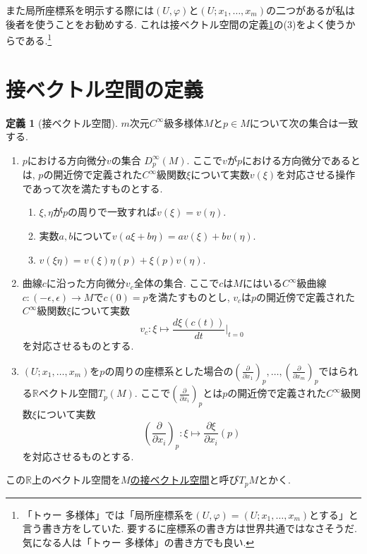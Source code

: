 \documentclass[dvipdfmx,a4paper,11pt]{article}
\newcommand{\R}{\mathbb{R}}
\theoremstyle{definition}
\newtheorem{dfn}[thm]{定義}
\newcommand{\pdrv}[2]{\frac{\partial #1}{\partial #2}}
\newcommand{\drv}[2]{\frac{d #1}{d#2}}
\begin{document}
また局所座標系を明示する際には$(U, \varphi)$と$(U; x_1, \ldots, x_m)$の二つがあるが私は後者を使うことをお勧めする. これは接ベクトル空間の定義\ref{tangent_vector_space}の(3)をよく使うからである.\footnote{「トゥー 多様体」では「局所座標系を$(U, \varphi)=(U; x_1, \ldots, x_m)$とする」と言う書き方をしていた. 要するに座標系の書き方は世界共通ではなさそうだ. 気になる人は「トゥー 多様体」の書き方でも良い.} 
 
\section{接ベクトル空間の定義}
\begin{tcolorbox}[
    colback = white,
    colframe = green!35!black,
    fonttitle = \bfseries,
    breakable = true]
    \begin{dfn}[接ベクトル空間]
    \label{tangent_vector_space}
    $m$次元$C^{\infty}$級多様体$M$と$p \in M$について次の集合は一致する.
     \begin{enumerate}
          \setlength{\parskip}{0cm}
  \setlength{\itemsep}{2pt} 
     \item $p$における方向微分$v$の集合 $D_{p}^{\infty}(M)$. ここで$v$が$p$における方向微分であるとは, $p$の開近傍で定義された$C^{\infty}$級関数$\xi$について実数$v(\xi)$を対応させる操作であって次を満たすものとする.
    \begin{enumerate}
         \setlength{\parskip}{0cm}
  \setlength{\itemsep}{2pt} 
    \item $\xi,\eta$が$p$の周りで一致すれば$v(\xi) =v(\eta)$.
    \item 実数$a,b$について$v(a\xi + b\eta)=av(\xi) + bv(\eta)$.
    \item $v(\xi\eta) = v(\xi)\eta(p) + \xi(p)v(\eta) $.
    \end{enumerate}
     \item 曲線$c$に沿った方向微分$v_{c}$全体の集合. ここで$c$は$M$にはいる$C^{\infty}$級曲線$c : (-\epsilon, \epsilon) \rightarrow M$で$c(0)=p$を満たすものとし, $v_{c}$は$p$の開近傍で定義された$C^{\infty}$級関数$\xi$について実数
     $$
     v_{c}:\xi \mapsto \drv{\xi(c(t))}{t}\Bigr|_{t=0}
     $$
     を対応させるものとする.
     \item $(U; x_1, \ldots, x_m)$を$p$の周りの座標系とした場合の$(\pdrv{}{x_1})_{p}, \ldots, (\pdrv{}{x_m})_{p}$ではられる$\R$ベクトル空間$T_{p}(M)$. ここで$(\pdrv{}{x_i})_{p}$とは$p$の開近傍で定義された$C^{\infty}$級関数$\xi$について実数
     $$
   \left(\pdrv{}{x_i}\right)_{p} :   \xi \mapsto \pdrv{\xi}{x_i}(p)
     $$
     を対応させるものとする.
     \end{enumerate}
     
     
この$\R$上のベクトル空間を\underline{$M$の接ベクトル空間}と呼び$T_{p}M$とかく. 
    \end{dfn}
    \end{tcolorbox}    
\end{document}
